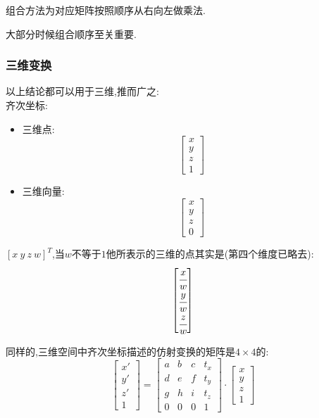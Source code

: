 \documentclass[UTF8,12pt]{ctexbook}
\begin{document}
{{{{{        组合方法为对应矩阵按照顺序从右向左做乘法.

        大部分时候组合顺序至关重要.

      }%

      \subsubsection{三维变换}{
        以上结论都可以用于三维,推而广之:\\

        齐次坐标:\begin{itemize}
          \item 三维点:$$\begin{bmatrix}
                    x \\
                    y \\
                    z \\
                    1
                  \end{bmatrix}$$
          \item 三维向量:$$\begin{bmatrix}
                    x \\
                    y \\
                    z \\
                    0
                  \end{bmatrix}$$
        \end{itemize}

        $\left[x\ y\ z\ w\right]^T$,当$w$不等于$1$他所表示的三维的点其实是(第四个维度已略去):
        $$\begin{bmatrix}
            \cfrac{x}{w} \\
            \cfrac{y}{w} \\
            \cfrac{z}{w} \\
          \end{bmatrix}$$

        同样的,三维空间中齐次坐标描述的仿射变换的矩阵是$4 \times 4$的:
        $$\begin{bmatrix}
            x\prime \\
            y\prime \\
            z\prime \\
            1
          \end{bmatrix}
          =
          \begin{bmatrix}
            a & b & c & t_x \\
            d & e & f & t_y \\
            g & h & i & t_z \\
            0 & 0 & 0 & 1
          \end{bmatrix}
          \cdot
          \begin{bmatrix}
            x \\
            y \\
            z \\
            1
          \end{bmatrix}$$

}}}}}
\end{document}
